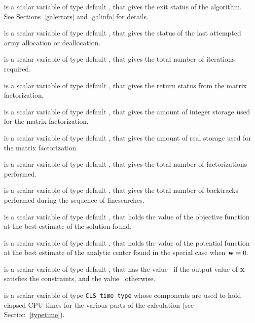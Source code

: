 \documentclass{galahad}
\newcommand{\packagename}{CLS}
\begin{document}
\begin{description}

 is a scalar variable of type default \integer, that gives the
exit status of the algorithm. See Sections~\ref{galerrors} and \ref{galinfo}
for details.

 is a scalar variable of type default \integer, that gives
the status of the last attempted array allocation or deallocation.

 is a scalar variable of type default \integer, that gives the
total number of iterations required.

 is a scalar variable of type default \integer, that
gives the return status from the matrix factorization.

 is a scalar variable of type default
\integer, that gives the amount of integer storage used for the matrix
factorization.

 is a scalar variable of type default \integer,
that gives the amount of real storage used for the matrix factorization.

 is a scalar variable of type default \integer, that gives the
total number of factorizations performed.

 is a scalar variable of type default \integer, that gives the
total number of backtracks performed during the sequence of linesearches.

 is a scalar variable of type default \realdp, that holds the
value of the objective function at the best estimate of the solution found.

 is a scalar variable of type default \realdp, that holds the
value of the potential function at the best estimate of the analytic center
found in the special case when ${\mathbf{w}} = 0$.

 is a scalar variable of type default \logical, that has the
value \true\ if the output value of ${\mathbf{x}}$ satisfies the constraints,
and the value \false\ otherwise.

 is a scalar variable of type {\tt \packagename\_time\_type} whose
components are used to hold elapsed CPU times for the various parts of the
calculation (see Section~\ref{typetime}).

\end{description}

\end{document}
